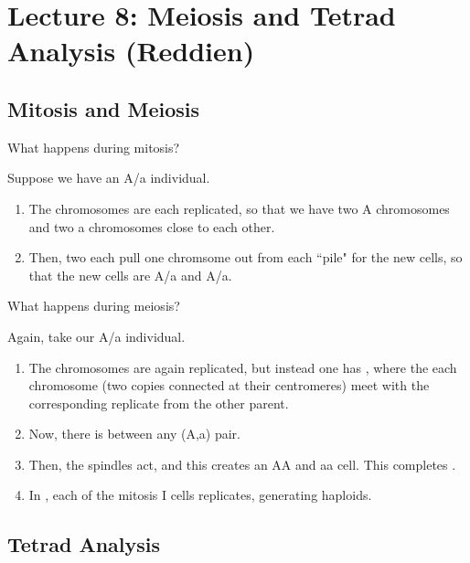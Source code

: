 \section*{Lecture 8: Meiosis and Tetrad Analysis (Reddien)}
\setcounter{section}{8}
\setcounter{subsection}{0}
\setcounter{defn}{0}
\setcounter{defncontainer}{0}

\subsection{Mitosis and Meiosis}

\begin{que}
	What happens during mitosis?
\end{que}

Suppose we have an A/a individual.

\begin{enumerate}
	\item The chromosomes are each replicated, so that we have two A chromosomes and two a chromosomes close to each other. 
	\item Then, two  each pull one chromsome out from each ``pile" for the new cells, so that the new cells are A/a and A/a.
\end{enumerate}

\begin{que}
	What happens during meiosis?
\end{que}

Again, take our A/a individual.

\begin{enumerate}
	\item The chromosomes are again replicated, but instead one has , where the each chromosome (two copies connected at their centromeres) meet with the corresponding replicate from the other parent.
	\item Now, there is  between any (A,a) pair.
	\item Then, the spindles act, and this creates an AA and aa cell. This completes .
	\item In , each of the mitosis I cells replicates, generating haploids.
\end{enumerate}

\subsection{Tetrad Analysis}

